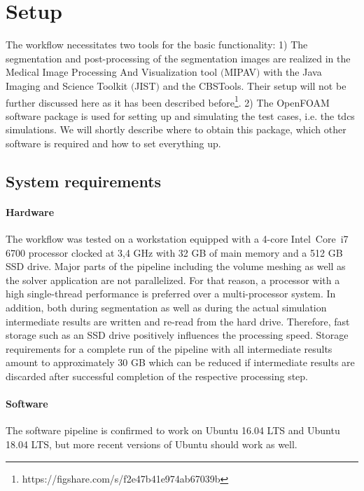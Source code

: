\section{Setup}
The workflow necessitates two tools for the basic functionality: 1) The segmentation and post-processing of the segmentation images
are realized in the Medical Image Processing And Visualization tool $($MIPAV$)$ \cite{mcauliffe2001medical} with the Java Imaging
and Science Toolkit $($JIST$)$ \cite{lucas2010java} and the CBSTools. Their setup will not be further discussed here as it has
been described before\footnote{https://figshare.com/s/f2e47b41e974ab67039b}\cite{kalloch2018semi}. 2) The OpenFOAM software
package is used for setting up and simulating the test cases, i.e. the tdcs simulations. We will shortly describe where to obtain
this package, which other software is required and how to set everything up.

\subsection{System requirements}
\paragraph{Hardware}
The workflow was tested on a workstation equipped with a 4-core Intel\textsuperscript{\textregistered}~Core\texttrademark~i7 6700
processor clocked at 3,4 GHz with 32 GB of main memory and a 512 GB SSD drive. Major parts of the pipeline including the volume
meshing as well as the solver application are not parallelized. For that reason, a processor with a high single-thread performance
is preferred over a multi-processor system. In addition, both during segmentation as well as during the actual simulation intermediate
results are written and re-read from the hard drive. Therefore, fast storage such as an SSD drive positively influences the
processing speed. Storage requirements for a complete run of the pipeline with all intermediate results amount to approximately
30 GB which can be reduced if intermediate results are discarded after successful completion of the respective processing step.

\paragraph{Software}
The software pipeline is confirmed to work on Ubuntu 16.04 LTS and Ubuntu 18.04 LTS, but more recent versions of Ubuntu should
work as well.


